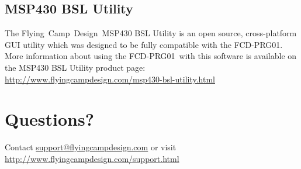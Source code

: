 \documentclass[10pt,letterpaper]{datasheet}
\newcommand{\PID}{FCD-PRG01}
\newcommand{\fcd}{Flying~Camp~Design}
\begin{document}
\subsection*{MSP430 BSL Utility}
The \fcd\ MSP430 BSL Utility is an open source, cross-platform GUI utility which was designed to be fully compatible with the \PID. More information about using the \PID\ with this software is available on the MSP430 BSL Utility product page: \newline
\href{http://www.flyingcampdesign.com/msp430-bsl-utility.html}{http://www.flyingcampdesign.com/msp430-bsl-utility.html}

\newpage

\section*{Questions?}
Contact %
\href{mailto:support@flyingcampdesign.com}%
     {support@flyingcampdesign.com} %
or visit %
\href{http://www.flyingcampdesign.com/support.html}%
     {http://www.flyingcampdesign.com/support.html}

\newpage


\end{document}
